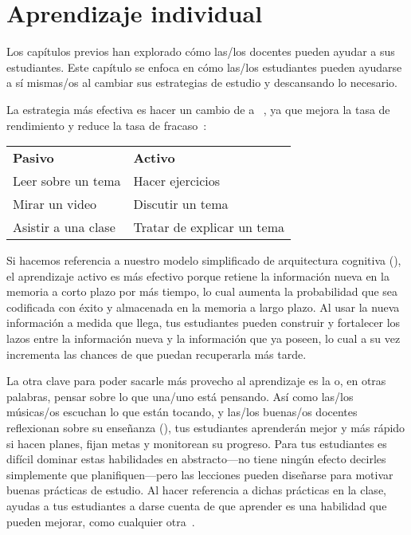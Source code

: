 \chapter{Aprendizaje individual}\label{s:individual}

Los capítulos previos han explorado cómo las/los docentes pueden ayudar a sus estudiantes.
Este capítulo se enfoca en cómo las/los estudiantes pueden ayudarse a sí mismas/os
al cambiar sus estrategias de estudio y descansando lo necesario.

La estrategia más efectiva es hacer un cambio de 
a ~\cite{Hpl2018},
ya que mejora la tasa de rendimiento y reduce la tasa de fracaso~\cite{Free2014}:

\begin{longtable}{ll}
\textbf{Pasivo}        & \textbf{Activo} \\
Leer sobre un tema        & Hacer ejercicios \\
Mirar un video            & Discutir un tema \\
Asistir a una clase        & Tratar de explicar un tema
\end{longtable}

\noindent
Si hacemos referencia a nuestro modelo simplificado de arquitectura cognitiva (),
el aprendizaje activo es más efectivo porque retiene la información nueva en la memoria a corto plazo por más tiempo,
lo cual aumenta la probabilidad que sea codificada con éxito y almacenada en la memoria a largo plazo.
Al usar la nueva información a medida que llega,
tus estudiantes pueden construir y fortalecer los lazos entre la información nueva y la información que ya poseen,
lo cual a su vez incrementa las chances de que puedan recuperarla más tarde.

La otra clave para poder sacarle más provecho al aprendizaje es la 
o, en otras palabras, pensar sobre lo que una/uno está pensando.
Así como las/los músicas/os escuchan lo que están tocando,
y las/los buenas/os docentes reflexionan sobre su enseñanza (),
tus estudiantes aprenderán mejor y más rápido si hacen planes,
fijan metas
y monitorean su progreso.
Para tus estudiantes es difícil dominar estas habilidades en abstracto---no tiene
ningún efecto decirles simplemente que planifiquen---pero
las lecciones pueden diseñarse para motivar buenas prácticas de estudio.
Al hacer referencia a dichas prácticas en la clase,
ayudas a tus estudiantes a darse cuenta de que aprender es una habilidad que pueden mejorar, como cualquier otra~\cite{McGu2015,Miya2018}.

